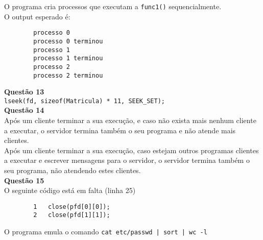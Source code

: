 \documentclass[a4paper, 11pt]{article}
\begin{document}
\noindent {} O programa cria processos que executam a \texttt{func1()} sequencialmente.\\

\noindent {} O output esperado é:
\begin{verbatim}
        processo 0
        processo 0 terminou
        processo 1
        processo 1 terminou
        processo 2
        processo 2 terminou
\end{verbatim}


\noindent \textbf{Questão 13}\\

\noindent {} \texttt{lseek(fd, sizeof(Matricula) * 11, SEEK\_SET);}\\


\noindent \textbf{Questão 14}\\

\noindent {} Após um cliente terminar a sua execução, e caso não exista mais nenhum cliente a executar, o servidor termina também o seu programa e não atende mais clientes.\\

\noindent {} Após um cliente terminar a sua execução, caso estejam outros programas clientes a executar e escrever mensagens para o servidor, o servidor termina também o seu programa, não atendendo estes clientes.\\


\noindent \textbf{Questão 15}\\

\noindent {} O seguinte código está em falta (linha 25)
\begin{verbatim}
        1   close(pfd[0][0]);
        2   close(pfd[1][1]);
\end{verbatim}

\noindent {} O programa emula o comando \texttt{cat etc/passwd | sort | wc -l}
\end{document}
